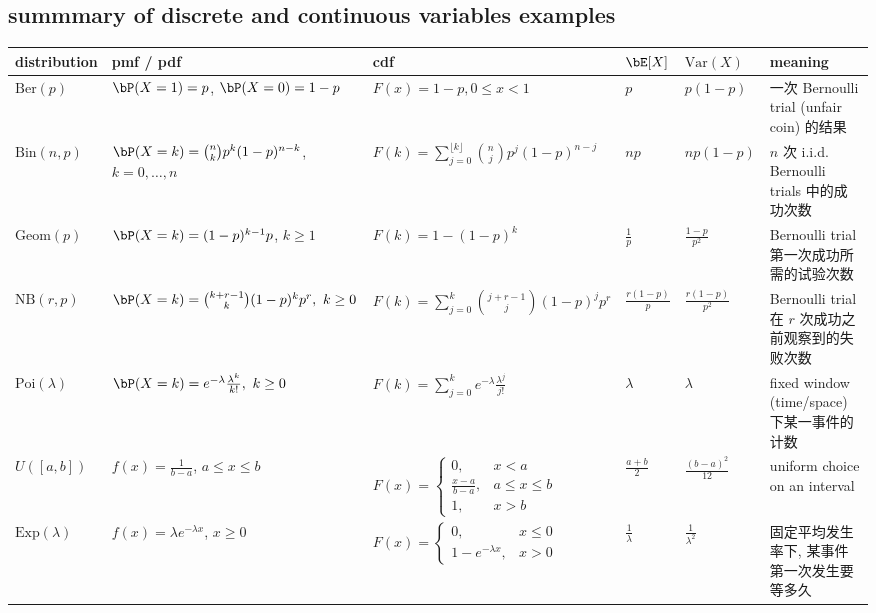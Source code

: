 \subsection{summmary of discrete and continuous variables examples}
\begin{center}

\renewcommand{\arraystretch}{1.25}
\setlength{\tabcolsep}{5pt}
\small
\begin{tabular}{|p{1.9cm}|p{2.8cm}|p{4.2cm}|p{1.2cm}|p{1.2cm}|p{4cm}|}
\hline
 \textbf{distribution} & \textbf{pmf / pdf} & \textbf{cdf} & \textbf{$\bE[X]$} & \textbf{$\text{Var}(X)$} & \textbf{meaning} \\
\hline
 $\text{Ber}(p)$ &
$\bP(X=1)=p$, 
$\bP(X=0)=1-p$ &
$F(x)=1-p, 0\le x<1$ &
$p$ &
$p(1-p)$ &
一次 Bernoulli trial (unfair coin) 的结果 \\
\hline
 $\text{Bin}(n,p)$ &
$\bP(X=k)=\binom{n}{k}p^k(1-p)^{n-k}$, $k=0,\dots,n$ &
$F(k)=\sum_{j=0}^{\lfloor k\rfloor}\binom{n}{j}p^j(1-p)^{n-j}$ &
$np$ &
$np(1-p)$ &
$n$ 次 i.i.d. Bernoulli trials 中的成功次数\\
\hline
$\text{Geom}(p)$  &
$\bP(X=k)=(1-p)^{k-1}p$, $k\ge 1$ &
$F(k)=1-(1-p)^k$ &
$\frac{1}{p}$ &
$\frac{1-p}{p^2}$ &
Bernoulli trial 第一次成功所需的试验次数 \\
\hline
$\text{NB}(r,p)$  &
$\bP(X=k)=\binom{k+r-1}{k}(1-p)^k p^r,\ k\ge 0$ &
$F(k)=\sum_{j=0}^{k}\binom{j+r-1}{j}(1-p)^j p^r$ &
$\frac{r(1-p)}{p}$ &
$\frac{r(1-p)}{p^2}$ &
Bernoulli trial 在 $r$ 次成功之前观察到的失败次数 \\
\hline
 $\text{Poi}(\lambda)$ &
$\bP(X=k)=e^{-\lambda}\frac{\lambda^k}{k!},\ k\ge 0$ &
$F(k)=\sum_{j=0}^{k}e^{-\lambda}\frac{\lambda^j}{j!}$ &
$\lambda$ &
$\lambda$ &
fixed window (time/space) 下某一事件的计数 \\
\hline
$U([a,b])$ &
$f(x)=\frac{1}{b-a}$, $a\le x\le b$ &
$F(x)=\begin{cases}
0,&x<a\\
\frac{x-a}{b-a},&a\le x\le b\\
1,&x>b
\end{cases}$ &
$\frac{a+b}{2}$ &
$\frac{(b-a)^2}{12}$ &
uniform choice on an interval\\
\hline
$\text{Exp}(\lambda)$ &
$f(x)=\lambda e^{-\lambda x}$, $x\ge 0$ &
$F(x)=\begin{cases}
0,&x\le 0\\
1-e^{-\lambda x},&x>0
\end{cases}$ &
$\frac{1}{\lambda}$ &
$\frac{1}{\lambda^2}$ &
固定平均发生率下, 某事件第一次发生要等多久\\

\end{tabular}
\end{center}
